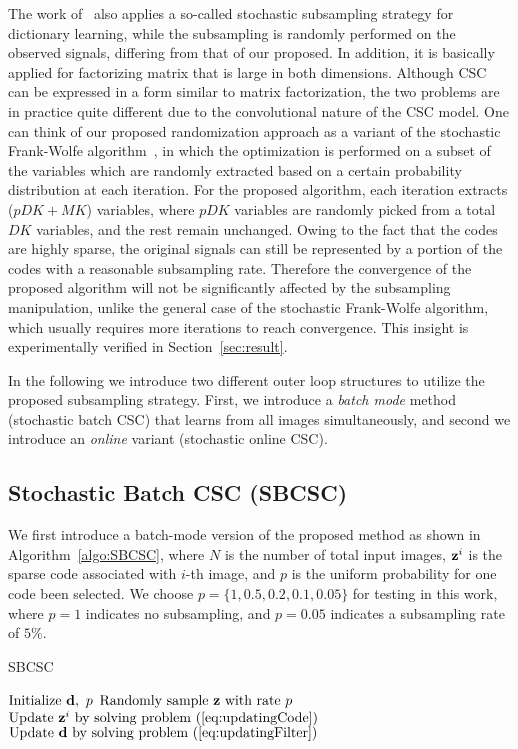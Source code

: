 The work of~\cite{mensch2016dictionary} also applies a so-called
stochastic subsampling strategy for dictionary learning, while the
subsampling is randomly performed on the observed signals, differing
from that of our proposed. In addition, it is basically applied for
factorizing matrix that is large in both dimensions. Although CSC can
be expressed in a form similar to matrix factorization, the two
problems are in practice quite different due to the convolutional
nature of the CSC model.  One can think of our proposed randomization
approach as a variant of the stochastic Frank-Wolfe
algorithm~\cite{reddi2016stochastic,pmlr-v80-kerdreux18a}, in which
the optimization is performed on a subset of the variables which are
randomly extracted based on a certain probability distribution at each
iteration. For the proposed algorithm, each iteration extracts
($pDK+MK$) variables, where $pDK$ variables are randomly picked from a
total $DK$ variables, and the rest remain unchanged. Owing to the fact
that the codes are highly sparse, the original signals can still be
represented by a portion of the codes with a reasonable subsampling
rate. Therefore the convergence of the proposed algorithm will not be
significantly affected by the subsampling manipulation, unlike the
general case of the stochastic Frank-Wolfe algorithm, which usually
requires more iterations to reach convergence. This insight is
experimentally verified in Section~\ref{sec:result}.

In the following we introduce two different outer loop structures to
utilize the proposed subsampling strategy. First, we introduce a {\em
  batch mode} method (stochastic batch CSC) that learns from all
images simultaneously, and second we introduce an {\em online}
variant (stochastic online CSC).

\subsection{Stochastic Batch CSC (SBCSC)}
We first introduce a batch-mode version of the proposed method as
shown in Algorithm~\ref{algo:SBCSC}, where $N$ is the number of total
input images, $\code^i$ is the sparse code associated with $i$-th
image, and $p$ is the uniform probability for one code been
selected. We choose $p=\{1, 0.5, 0.2, 0.1, 0.05\}$ for testing in this
work, where $p=1$ indicates no subsampling, and $p=0.05$ indicates a
subsampling rate of $5\%$.

\begin{algorithm}[H]
\caption{SBCSC} \label{algo:SBCSC}
\begin{algorithmic}[1]
\State $\text{Initialize } \filter, ~p$
    \State $ \text{Randomly sample }\code \text{ with rate } p $
        \State $ \text{Update } \code^i \text{ by solving problem~(\ref{eq:updatingCode}})$
    \EndFor
    \State $\text{Update } \filter \text{ by solving problem~(\ref{eq:updatingFilter}})$
\EndWhile
\end{algorithmic}
\end{algorithm}


